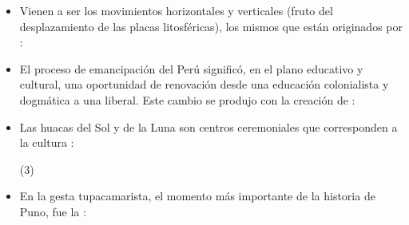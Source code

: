 \documentclass[10pt, twocolumn, landscape, a4paper]{article}
\begin{document}
\begin{itemize}
\item{Vienen a ser los movimientos horizontales y verticales (fruto del desplazamiento de las placas litosféricas), los mismos que están originados por : 
\begin{tasks}
\end{tasks}}
\item{El proceso de emancipación del Perú significó, en el plano educativo y cultural, una oportunidad de renovación desde una educación colonialista y dogmática a una liberal. Este cambio se produjo con la creación de :
\begin{tasks}
\end{tasks}}
\item{Las huacas del Sol y de la Luna son centros ceremoniales que corresponden a la cultura :
\begin{tasks}(3)
\end{tasks}}
\item{En la gesta tupacamarista, el momento más importante de la historia de Puno, fue la :
\begin{tasks}
\end{tasks}
}
\end{itemize}
\end{document}
